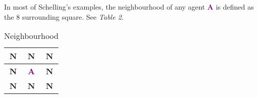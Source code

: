 \documentclass[../main.tex]{subfiles}
\begin{document}
\begin{table}[H]
\begin{center}
\end{center}
\caption{Initial condition of one of Schelling's experiments} 
\end{table}

In most of Schelling's examples, the neighbourhood of any agent \textbf{\textcolor{purple}{A}} is defined as the 8 surrounding square. See \textit{Table 2}.

\begin{table}[H]
\begin{center}
\begin{tabular}{| c |c| c|}
\hline
\textbf{\textcolor{mygreen}{N}} & \textbf{\textcolor{mygreen}{N}} & \textbf{\textcolor{mygreen}{N}} \\
\hline
\textbf{\textcolor{mygreen}{N}} & \textbf{\textcolor{purple}{A}} & \textbf{\textcolor{mygreen}{N}}  \\
\hline
\textbf{\textcolor{mygreen}{N}} & \textbf{\textcolor{mygreen}{N}} & \textbf{\textcolor{mygreen}{N}}  \\
\hline
\end{tabular}
\end{center}
\caption{Neighbourhood} 
\end{table}
\end{document}
